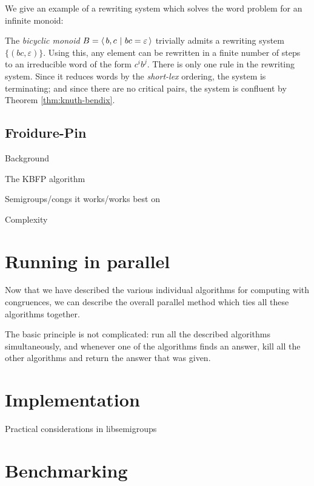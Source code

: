 We give an example of a rewriting system which solves the word problem for an
infinite monoid:

\begin{example}
  \label{ex:bicyclic}
  The \textit{bicyclic monoid} $B = \left\langle\,b,c ~\middle|~ bc=\varepsilon\,\right\rangle$ trivially admits
  a rewriting system $\{(bc, \varepsilon)\}$.  Using this, any element can be
  rewritten in a finite number of steps to an irreducible word of the form
  $c^ib^j$.  There is only one rule in the rewriting system.  Since it reduces
  words by the \textit{short-lex} ordering, the system is terminating; and since
  there are no critical pairs, the system is confluent by Theorem
  \ref{thm:knuth-bendix}.
\end{example}

\clearpage

\subsection{Froidure-Pin}
\label{sec:fp}

Background

The KBFP algorithm

Semigroups/congs it works/works best on

Complexity

\section{Running in parallel}
\label{sec:running-in-parallel}

Now that we have described the various individual algorithms for computing with
congruences, we can describe the overall parallel method which ties all these
algorithms together.

The basic principle is not complicated: run all the described algorithms
simultaneously, and whenever one of the algorithms finds an answer, kill all the
other algorithms and return the answer that was given.

\section{Implementation}

Practical considerations in libsemigroups

\clearpage

\section{Benchmarking}
\label{sec:benchmarking}

